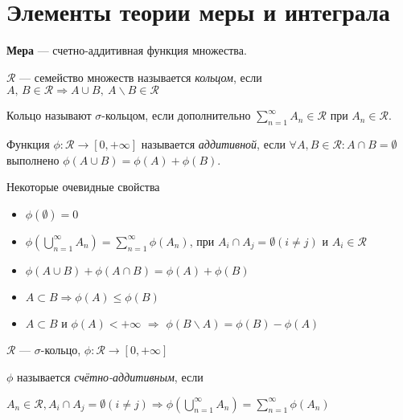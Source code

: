 \newpage

\section{Элементы теории меры и интеграла}

\textbf{Мера} --- счетно-аддитивная функция множества.

\begin{definition}
  $\mathcal{R}$ --- семейство множеств называется \textit{кольцом}, если $A,\, B \in \mathcal{R} \Rightarrow A \cup B,\ A \backslash B \in \mathcal{R}$
\end{definition}

\begin{definition}
  Кольцо называют $\sigma$-кольцом, если дополнительно $\sum_{n = 1}^{\infty} A_n \in \mathcal{R}$ при $A_n \in \mathcal{R}$. 
\end{definition}

\begin{definition}
  Функция $\phi : \mathcal{R} \to [0, +\infty]$ называется \textit{аддитивной}, если $\forall A, B \in \mathcal{R} : A\cap B = \emptyset$ выполнено
  $\phi(A\cup B) = \phi(A) + \phi(B)$.
\end{definition}

Некоторые очевидные свойства

\begin{itemize}
  \item $\phi(\emptyset) = 0$
  \item $\phi(\bigcup_{n = 1}^{\infty} A_n) = \sum_{n = 1}^{\infty} \phi(A_n)$,
        при $A_i \cap A_j = \emptyset (i \ne j)$ и $A_i \in \mathcal{R}$
  \item $\phi(A\cup B) + \phi(A \cap B) = \phi(A) + \phi(B)$
  \item $A \subset B \Rightarrow \phi(A) \leq \phi(B)$
  \item $A \subset B$ и $\phi(A) < +\infty$ $\Rightarrow$ $\phi(B\backslash A) = \phi(B) - \phi(A)$
\end{itemize}

\begin{definition}
  $\mathcal{R}$ --- $\sigma$-кольцо, $\phi: \mathcal{R} \to [0, +\infty]$

  $\phi$ называется \textit{счётно-аддитивным}, если

  $A_n \in \mathcal{R}, A_i \cap A_j = \emptyset (i \ne j) \Rightarrow \phi(\bigcup_{n=1}^{\infty} A_n) = \sum_{n = 1}^{\infty} \phi(A_n)$
\end{definition}

